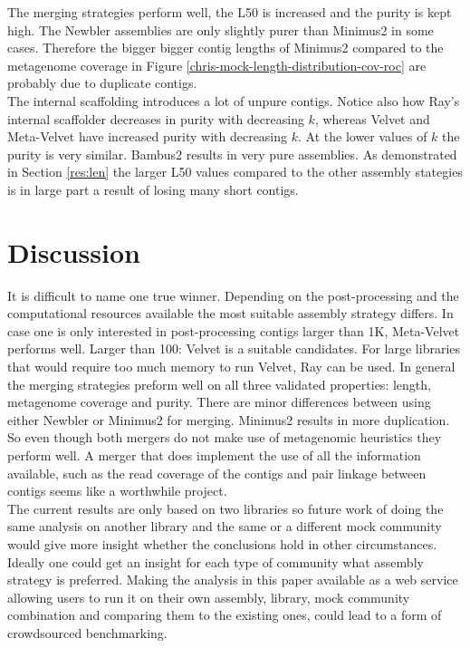 \documentclass[a4paper,12pt]{report}
\begin{document}
The merging strategies perform well, the L50 is increased and the purity is
kept high. The Newbler assemblies are only slightly purer than Minimus2 in some
cases. Therefore the bigger bigger contig lengths of Minimus2 compared to the
metagenome coverage in Figure \ref{chris-mock-length-distribution-cov-roc} are
probably due to duplicate contigs.\\


The internal scaffolding introduces a lot of unpure contigs. Notice also how
Ray's internal scaffolder decreases in purity with decreasing $k$, whereas
Velvet and Meta-Velvet have increased purity with decreasing $k$. At the lower
values of $k$ the purity is very similar. Bambus2 results in very pure
assemblies. As demonstrated in Section \ref{res:len} the larger L50 values
compared to the other assembly stategies is in large part a result of losing
many short contigs.\\



\chapter{Discussion}
It is difficult to name one true winner. Depending on the post-processing and
the computational resources available the most suitable assembly strategy
differs. In case one is only interested in post-processing contigs larger than
1K, Meta-Velvet performs well. Larger than 100: Velvet is a suitable
candidates. For large libraries that would require too much memory to run
Velvet, Ray can be used. In general the merging strategies preform well on all
three validated properties: length, metagenome coverage and purity. There are
minor differences between using either Newbler or Minimus2 for merging.
Minimus2 results in more duplication. So even though both mergers do not make
use of metagenomic heuristics they perform well. A merger that does implement
the use of all the information available, such as the read coverage of the
contigs and pair linkage between contigs seems like a worthwhile project.\\


The current results are only based on two libraries so future work of doing the
same analysis on another library and the same or a different mock community
would give more insight whether the conclusions hold in other circumstances.
Ideally one could get an insight for each type of community what assembly
strategy is preferred. Making the analysis in this paper available as a web
service allowing users to run it on their own assembly, library, mock community
combination and comparing them to the existing ones, could lead to a form of
crowdsourced benchmarking.\\
\end{document}
